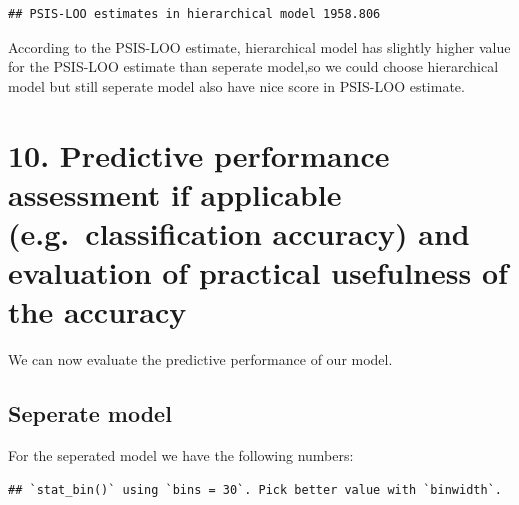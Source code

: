 \documentclass[
]{article}
\newenvironment{Shaded}{\begin{snugshade}}{\end{snugshade}}
\newcommand{\AttributeTok}[1]{\textcolor[rgb]{0.77,0.63,0.00}{#1}}
\newcommand{\DecValTok}[1]{\textcolor[rgb]{0.00,0.00,0.81}{#1}}
\newcommand{\FunctionTok}[1]{\textcolor[rgb]{0.00,0.00,0.00}{#1}}
\newcommand{\NormalTok}[1]{#1}
\newcommand{\SpecialCharTok}[1]{\textcolor[rgb]{0.00,0.00,0.00}{#1}}
\newcommand{\StringTok}[1]{\textcolor[rgb]{0.31,0.60,0.02}{#1}}
\begin{document}
\begin{verbatim}
## PSIS-LOO estimates in hierarchical model 1958.806
\end{verbatim}

According to the PSIS-LOO estimate, hierarchical model has slightly
higher value for the PSIS-LOO estimate than seperate model,so we could
choose hierarchical model but still seperate model also have nice score
in PSIS-LOO estimate.

\newpage

\hypertarget{predictive-performance-assessment-if-applicable-e.g.-classification-accuracy-and-evaluation-of-practical-usefulness-of-the-accuracy}{%
\section{10. Predictive performance assessment if applicable
(e.g.~classification accuracy) and evaluation of practical usefulness of
the
accuracy}\label{predictive-performance-assessment-if-applicable-e.g.-classification-accuracy-and-evaluation-of-practical-usefulness-of-the-accuracy}}

We can now evaluate the predictive performance of our model.

\hypertarget{seperate-model}{%
\subsection{Seperate model}\label{seperate-model}}

For the seperated model we have the following numbers:

\begin{Shaded}
\end{Shaded}

\begin{verbatim}
## `stat_bin()` using `bins = 30`. Pick better value with `binwidth`.
\end{verbatim}
\end{document}
